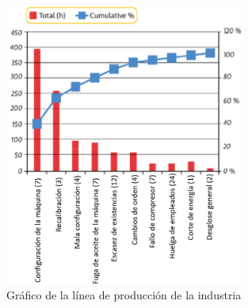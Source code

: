 \documentclass{article}
\theoremstyle{mytheoremstyle}
\theoremstyle{mytheoremstyle}
\theoremstyle{myproblemstyle}
\begin{document}
\begin{enumerate}
\begin{itemize}
\begin{table}[h!]
\begin{tabular}{|l|l|l|l|l|}
	\end{tabular}
	\end{table}	
	      \begin{figure}[H]
		      \centering
		      \includegraphics[width=0.7\textwidth]{Grapich.png}
		      \caption{Gráfico de la línea de producción de la industria}
		      \label{fig:imagen2}
	      \end{figure}


\end{itemize}
\end{enumerate}
\end{document}
